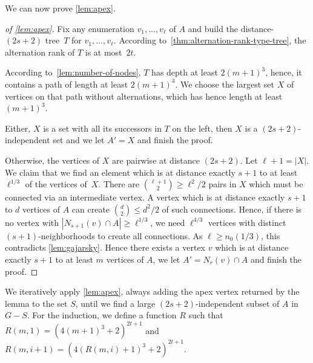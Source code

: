 We can now prove \cref{lem:apex}. 

\begin{proof}[of \cref{lem:apex}]
Fix any enumeration $v_1,\ldots, v_\ell$ of $A$ and
build the distance-$(2s+2)$ tree~$T$ for
$v_1,\ldots,v_\ell$. According to~\cref{thm:alternation-rank-type-tree}, 
the alternation rank of $T$ is at most~$2t$. 

According 
to~\cref{lem:number-of-nodes}, $T$ has depth at least $2(m+1)^3$, hence, 
it contains a path of length at least $2(m+1)^3$. We choose the largest set $X$
of vertices on that path without alternations, which has hence length
at least $(m+1)^3$. 

Either, $X$ is a set with all its successors in $T$ on the left, 
then $X$ is a $(2s+2)$-independent set and we let $A'=X$ and finish the proof.

Otherwise, the vertices of $X$ are pairwise at distance $(2s+2)$. Let $\ell+1=|X|$. 
We claim that we find an element which is at distance exactly $s+1$ 
to at least $\ell^{1/3}$
of the vertices of~$X$. There are $\binom{\ell+1}{2}\geq \ell^2/2$ pairs in $X$ which 
must be connected via an intermediate vertex. A vertex which is at distance
exactly $s+1$ to $d$ vertices of $A$ can create $\binom{d}{2}\leq d^2/2$ of such connections. 
Hence, if there is no vertex with $|N_{s+1}(v)\cap A|\geq \ell^{1/3}$, 
we need $\ell^{4/3}$ vertices with distinct $(s+1)$-neighborhoods
to create all connections. As $\ell\geq n_0(1/3)$, 
this contradicts \cref{lem:gajarsky}. Hence there exists a vertex $v$ which is 
at distance exactly $s+1$ to at least $m$ vertices of $A$, 
we let $A'=N_r(v)\cap A$ and finish the proof. 
\end{proof}

We iteratively apply \cref{lem:apex}, always adding the apex vertex 
returned by the lemma to the set $S$, until we find a large 
$(2s+2)$-independent subset of $A$ in $G-S$. For the induction, we
define a function $R$ such that $R(m,1)=(4(m+1)^3+2)^{2t+1}$
and $R(m, i+1)=(4(R(m,i)+1)^3+2)^{2t+1}$.

